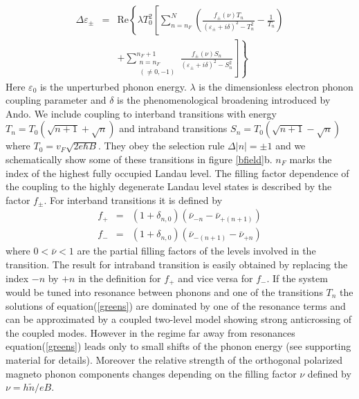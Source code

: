 \documentclass[prl,aps,superscriptaddress,reprint]{revtex4-1}
\begin{document}
\begin{eqnarray}
\label{greens}
\Delta\varepsilon_{\pm} &=& \mathrm{Re}\left\lbrace \lambda T_0^2 \left[ \sum_{n=n_F}^N\left(\frac{f_{\pm}\left(\nu\right) T_n}{\left(\varepsilon_{\pm}+i\delta\right)^2-T_n^2}-\frac{1}{T_n}\right)\right.\right.\nonumber \\
& &\left.\left. +\sum_{\substack{n=n_F\\ (\neq 0,-1)}}^{n_F+1}\frac{f_{\pm}\left(\nu\right) S_n}{\left(\varepsilon_{\pm}+i\delta\right)^2-S_n^2}\right]\right\rbrace
\end{eqnarray}
Here $\varepsilon_0$ is the unperturbed phonon energy. $\lambda$ is the dimensionless electron phonon coupling parameter and $\delta$ is the phenomenological broadening introduced by Ando\cite{ando2007magnetic}. We include coupling to interband transitions with energy $T_n=T_0\left(\sqrt{n+1}+\sqrt{n}\right)$ and intraband transitions $S_n=T_0\left(\sqrt{n+1}-\sqrt{n}\right)$ where $T_0=v_F\sqrt{2e\hbar B}$. They obey the selection rule $\Delta\left|n\right|=\pm 1$ and we schematically show some of these transitions in figure \ref{bfield}b. $n_F$ marks the index of the highest fully occupied Landau level. The filling factor dependence of the coupling to the highly degenerate Landau level states is described by the factor $f_{\pm}$. For interband transitions it is defined by
\begin{eqnarray}
f_{+}&=&(1+\delta_{n,0})(\bar{\nu}_{-n}-\bar{\nu}_{+(n+1)})\nonumber\\
f_{-}&=&(1+\delta_{n,0})(\bar{\nu}_{-(n+1)}-\bar{\nu}_{+n})
\end{eqnarray}
where $0<\bar{\nu}<1$ are the partial filling factors of the levels involved in the transition. The result for intraband transition is easily obtained by replacing the index $-n$ by $+n$ in the definition for $f_+$ and vice versa for $f_-$.
If the system would be tuned into resonance between phonons and one of the transitions $T_n$ the solutions of equation(\ref{greens}) are dominated by one of the resonance terms and can be approximated by a coupled two-level model showing strong anticrossing of the coupled modes\cite{goerbig2007filling,PhysRevLett.110.227402}. However in the regime far away from resonances equation(\ref{greens}) leads only to small shifts of the phonon energy\cite{ando2007magnetic} (see supporting material for details).
Moreover the relative strength of the orthogonal polarized magneto phonon components changes depending on the filling factor $\nu$ defined by $\nu = h\widetilde{n}/eB$. 
\end{document}
